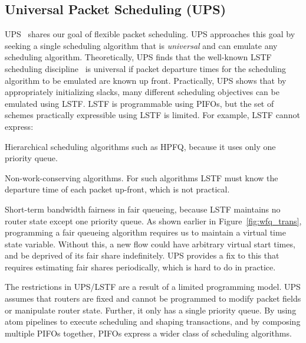 \subsection{Universal Packet Scheduling (UPS)} UPS~\cite{ups} shares our goal
of flexible packet scheduling. UPS approaches this goal by seeking a single
scheduling algorithm that is {\em universal} and can emulate any scheduling
algorithm. Theoretically, UPS finds that the well-known LSTF scheduling
discipline~\cite{lstf} is universal if packet departure times for the
scheduling algorithm to be emulated are known up front. Practically, UPS shows
that by appropriately initializing slacks, many different scheduling objectives
can be emulated using LSTF. LSTF is programmable using PIFOs, but the set of
schemes practically expressible using LSTF is limited. For example, LSTF cannot
express:
\begin{CompactEnumerate}
\item Hierarchical scheduling algorithms such as HPFQ, because it uses only one
priority queue.
\item Non-work-conserving algorithms. For such algorithms LSTF must know the
departure time of each packet up-front, which is not practical.
\item Short-term bandwidth fairness in fair queueing, because LSTF maintains no
  router state except one priority queue. As shown earlier in
  Figure~\ref{fig:wfq_trans}, programming a fair queueing algorithm requires us
  to maintain a virtual time state variable. Without this, a new flow could have
  arbitrary virtual start times, and be deprived of its fair share indefinitely.
  UPS provides a fix to this that requires estimating fair shares periodically,
  which is hard to do in practice.
\end{CompactEnumerate}
The restrictions in UPS/LSTF are a result of a limited programming model. UPS
assumes that routers are fixed and cannot be programmed to modify packet fields
or manipulate router state. Further, it only has a single priority queue.  By
using atom pipelines to execute scheduling and shaping transactions, and by
composing multiple PIFOs together, PIFOs express a wider class of scheduling
algorithms.

